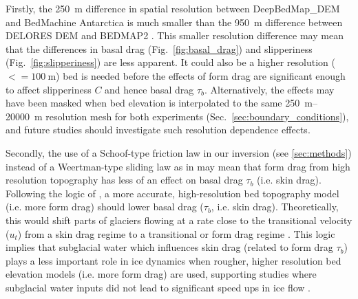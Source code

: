 Firstly, the \SI{250}{\metre} difference in spatial resolution between DeepBedMap\_DEM \citep{LeongDeepBedMap2020} and BedMachine Antarctica \citep{MorlighemMEaSUREsBedMachineAntarctica2020} is much smaller than the \SI{950}{\metre} difference between DELORES DEM \citep{BinghamDiverselandscapesPine2017} and BEDMAP2 \citep{FretwellBedmap2improvedice2013}.
This smaller resolution difference may mean that the differences in basal drag (Fig.~\ref{fig:basal_drag}) and slipperiness (Fig.~\ref{fig:slipperiness}) are less apparent.
It could also be a higher resolution ($<= \SI{100}{\metre}$) bed is needed \citep[e.g.][]{Grahamhighresolutionsyntheticbed2017} before the effects of form drag are significant enough to affect slipperiness $C$ and hence basal drag $\tau_b$.
Alternatively, the effects may have been masked when bed elevation is interpolated to the same \SIrange{250}{20000}{\metre} resolution mesh for both experiments (Sec.~\ref{sec:boundary_conditions}), and future studies should investigate such resolution dependence effects.

Secondly, the use of a Schoof-type friction law in our inversion (see \ref{sec:methods}) instead of a Weertman-type sliding law as in \citet{Kyrke-SmithRelevanceDetailBasal2018} may mean that form drag from high resolution topography has less of an effect on basal drag $\tau_b$ (i.e. skin drag).
Following the logic of \citet{Kyrke-SmithRelevanceDetailBasal2018}, a more accurate, high-resolution bed topography model (i.e. more form drag) should lower basal drag ($\tau_b$, i.e. skin drag).
Theoretically, this would shift parts of glaciers flowing at a rate close to the transitional velocity ($u_t$) from a skin drag regime to a transitional or form drag regime \citep[see Fig.~\ref{fig:1.3},][]{Minchewuniversalglacierslip2020}.
This logic implies that subglacial water which influences skin drag (related to form drag $\tau_b$) plays a less important role in ice dynamics when rougher, higher resolution bed elevation models (i.e. more form drag) are used, supporting studies where subglacial water inputs did not lead to significant speed ups in ice flow \citep[e.g.][]{SmithConnectedsubglaciallake2017}.

